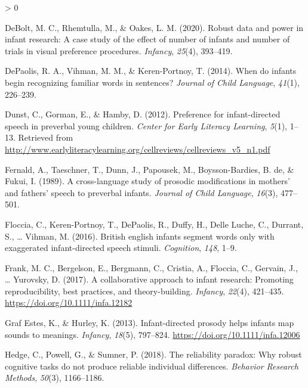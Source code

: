 \documentclass[
  english,
  man,floatsintext]{apa6}
\newlength{\cslhangindent}
\newenvironment{CSLReferences}[2] %
 {%
  \setlength{\parindent}{0pt}
  \ifodd #1 \everypar{\setlength{\hangindent}{\cslhangindent}}\ignorespaces\fi
  \ifnum #2 > 0
  \setlength{\parskip}{#2\baselineskip}
  \fi
 }%
 {}
\begin{document}
\begin{CSLReferences}{1}{0}
\leavevmode\hypertarget{ref-debolt2020robust}{}%
DeBolt, M. C., Rhemtulla, M., \& Oakes, L. M. (2020). Robust data and power in infant research: A case study of the effect of number of infants and number of trials in visual preference procedures. \emph{Infancy}, \emph{25}(4), 393--419.

\leavevmode\hypertarget{ref-depaolis2014infants}{}%
DePaolis, R. A., Vihman, M. M., \& Keren-Portnoy, T. (2014). When do infants begin recognizing familiar words in sentences? \emph{Journal of Child Language}, \emph{41}(1), 226--239.

\leavevmode\hypertarget{ref-dunst2012preference}{}%
Dunst, C., Gorman, E., \& Hamby, D. (2012). Preference for infant-directed speech in preverbal young children. \emph{Center for Early Literacy Learning}, \emph{5}(1), 1--13. Retrieved from \url{http://www.earlyliteracylearning.org/cellreviews/cellreviews_v5_n1.pdf}

\leavevmode\hypertarget{ref-fernald1989cross}{}%
Fernald, A., Taeschner, T., Dunn, J., Papousek, M., Boysson-Bardies, B. de, \& Fukui, I. (1989). A cross-language study of prosodic modifications in mothers' and fathers' speech to preverbal infants. \emph{Journal of Child Language}, \emph{16}(3), 477--501.

\leavevmode\hypertarget{ref-floccia2016british}{}%
Floccia, C., Keren-Portnoy, T., DePaolis, R., Duffy, H., Delle Luche, C., Durrant, S., \ldots{} Vihman, M. (2016). British english infants segment words only with exaggerated infant-directed speech stimuli. \emph{Cognition}, \emph{148}, 1--9.

\leavevmode\hypertarget{ref-frank2017collaborative}{}%
Frank, M. C., Bergelson, E., Bergmann, C., Cristia, A., Floccia, C., Gervain, J., \ldots{} Yurovsky, D. (2017). A collaborative approach to infant research: Promoting reproducibility, best practices, and theory-building. \emph{Infancy}, \emph{22}(4), 421--435. \url{https://doi.org/10.1111/infa.12182}

\leavevmode\hypertarget{ref-graf2013infant}{}%
Graf Estes, K., \& Hurley, K. (2013). Infant-directed prosody helps infants map sounds to meanings. \emph{Infancy}, \emph{18}(5), 797--824. \url{https://doi.org/10.1111/infa.12006}

\leavevmode\hypertarget{ref-hedge2018reliability}{}%
Hedge, C., Powell, G., \& Sumner, P. (2018). The reliability paradox: Why robust cognitive tasks do not produce reliable individual differences. \emph{Behavior Research Methods}, \emph{50}(3), 1166--1186.


\end{CSLReferences}
\end{document}
